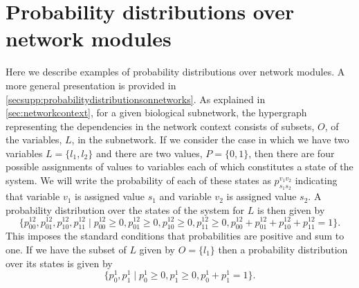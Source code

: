\section{Probability distributions over network modules}\label{sec:probabilitydistributionsonnetworks}
Here we describe examples of probability distributions over network modules. A more general presentation is provided in  \autoref{secsupp:probabilitydistributionsonnetworks}.
As explained in \autoref{sec:networkcontext}, for a given biological subnetwork, the hypergraph representing the dependencies in the network context consists of subsets, $O$, of the variables, $L$, in the subnetwork.
If we consider the case in which we have two variables $L=\{l_1,l_2\}$ and there are two values, $P=\{0,1\}$, then there are four possible assignments of values to variables each of which constitutes a state of the system. We will write the probability of each of these states as $p^{v_1v_2}_{s_1s_2}$ indicating that variable $v_1$ is assigned value $s_1$ and variable $v_2$ is assigned value $s_2$. A probability distribution over the states of the system for $L$ is then given by
\begin{equation}\label{eq:examplejointdist}
\{p^{12}_{00},p^{12}_{01},p^{12}_{10},p^{12}_{11} \mid p^{12}_{00} \geq 0, p^{12}_{01} \geq 0,p^{12}_{10} \geq 0,p^{12}_{11} \geq 0, p^{12}_{00} + p^{12}_{01} + p^{12}_{10} + p^{12}_{11} = 1 \}.
\end{equation}
This imposes the standard conditions that probabilities are positive and sum to one. If we have the subset of $L$ given by $O = \{l_1\}$ then a probability distribution over its states is given by
\begin{equation}\label{eq:examplemargdist}
\{p^{1}_{0}, p^{1}_{1} \mid p^{1}_{0} \geq 0, p^{1}_{1} \geq 0, p^{1}_{0}+p^{1}_{1} = 1 \}.
\end{equation}
